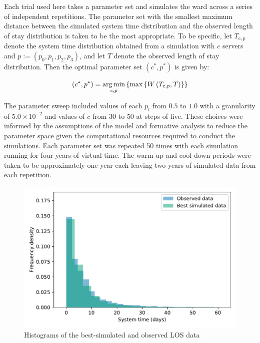 Each trial used here takes a parameter set and simulates the ward across a
series of independent repetitions. The parameter set with the smallest maximum
distance between the simulated system time distribution and the observed length
of stay distribution is taken to be the most appropriate. To be specific, let
\(T_{c,p}\) denote the system time distribution obtained from a simulation with
\(c\) servers and \(p := \left(p_0,p_1,p_2,p_3\right)\), and let \(T\) denote
the observed length of stay distribution. Then the optimal parameter set
\(\left(c^*, p^*\right)\) is given by:

\begin{equation}\label{eq:parameters}
    \left(c^*, p^*\right) = \argmin_{c, p} \left\{%
        \max \left\{ W\left(T_{c,p}, T\right) \right\}%
    \right\}
\end{equation}

The parameter sweep included values of each \(p_l\) from \(0.5\) to \(1.0\) with
a granularity of \(5.0 \times 10^{-2}\) and values of \(c\) from \(30\) to
\(50\) at steps of five. These choices were informed by the assumptions of the
model and formative analysis to reduce the parameter space given the
computational resources required to conduct the simulations. Each parameter set
was repeated 50 times with each simulation running for four years of virtual
time. The warm-up and cool-down periods were taken to be approximately one year
each leaving two years of simulated data from each repetition.

\begin{figure}
    \centering
    \includegraphics[width=\imgwidth]{best_params}
    \caption{%
        Histograms of the best-simulated and observed LOS data
    }\label{fig:best_params}
\end{figure}

